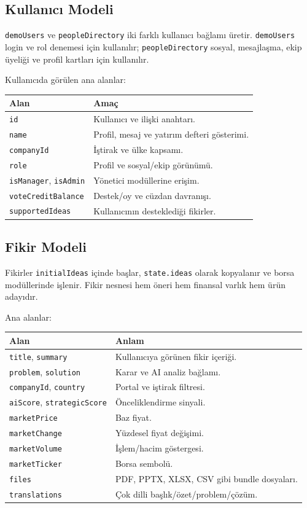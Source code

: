 \documentclass[11pt,a4paper]{article}
\newcommand{\code}[1]{\texttt{#1}}
\begin{document}
\subsection{Kullanıcı Modeli}

\code{demoUsers} ve \code{peopleDirectory} iki farklı kullanıcı bağlamı üretir. \code{demoUsers} login ve rol denemesi için kullanılır; \code{peopleDirectory} sosyal, mesajlaşma, ekip üyeliği ve profil kartları için kullanılır.

Kullanıcıda görülen ana alanlar:

\begin{longtable}{p{}p{}}
\toprule
\textbf{Alan} & \textbf{Amaç}\\
\midrule
\code{id} & Kullanıcı ve ilişki anahtarı.\\
\code{name} & Profil, mesaj ve yatırım defteri gösterimi.\\
\code{companyId} & İştirak ve ülke kapsamı.\\
\code{role} & Profil ve sosyal/ekip görünümü.\\
\code{isManager}, \code{isAdmin} & Yönetici modüllerine erişim.\\
\code{voteCreditBalance} & Destek/oy ve cüzdan davranışı.\\
\code{supportedIdeas} & Kullanıcının desteklediği fikirler.\\
\bottomrule
\end{longtable}

\subsection{Fikir Modeli}

Fikirler \code{initialIdeas} içinde başlar, \code{state.ideas} olarak kopyalanır ve borsa modüllerinde işlenir. Fikir nesnesi hem öneri hem finansal varlık hem ürün adayıdır.

Ana alanlar:

\begin{longtable}{p{}p{}}
\toprule
\textbf{Alan} & \textbf{Anlam}\\
\midrule
\code{title}, \code{summary} & Kullanıcıya görünen fikir içeriği.\\
\code{problem}, \code{solution} & Karar ve AI analiz bağlamı.\\
\code{companyId}, \code{country} & Portal ve iştirak filtresi.\\
\code{aiScore}, \code{strategicScore} & Önceliklendirme sinyali.\\
\code{marketPrice} & Baz fiyat.\\
\code{marketChange} & Yüzdesel fiyat değişimi.\\
\code{marketVolume} & İşlem/hacim göstergesi.\\
\code{marketTicker} & Borsa sembolü.\\
\code{files} & PDF, PPTX, XLSX, CSV gibi bundle dosyaları.\\
\code{translations} & Çok dilli başlık/özet/problem/çözüm.\\
\bottomrule
\end{longtable}
\end{document}
